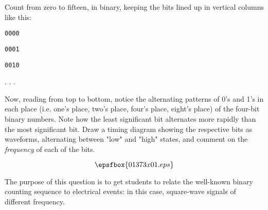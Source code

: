 

Count from zero to fifteen, in binary, keeping the bits lined up in vertical columns like this:

\vskip 10pt

{\tt 0000}

{\tt 0001}

{\tt 0010}

 . . .

\vskip 150pt

Now, reading from top to bottom, notice the alternating patterns of 0's and 1's in each place (i.e. one's place, two's place, four's place, eight's place) of the four-bit binary numbers.  Note how the least significant bit alternates more rapidly than the most significant bit.  Draw a timing diagram showing the respective bits as waveforms, alternating between "low" and "high" states, and comment on the {\it frequency} of each of the bits.







$$\epsfbox{01373x01.eps}$$







The purpose of this question is to get students to relate the well-known binary counting sequence to electrical events: in this case, square-wave signals of different frequency.




